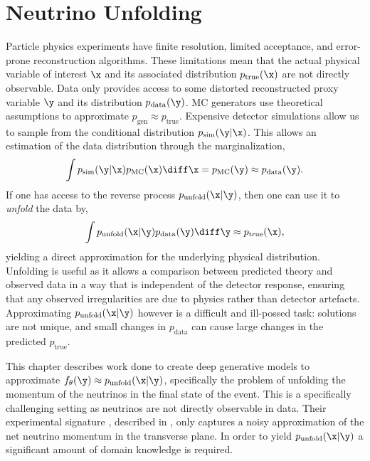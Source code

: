 \chapter{Neutrino Unfolding}
\label{ch:gnns}

Particle physics experiments have finite resolution, limited acceptance, and error-prone reconstruction algorithms.
These limitations mean that the actual physical variable of interest $\x$ and its associated distribution $p_\text{true}(\x)$ are not directly observable.
Data only provides access to some distorted reconstructed proxy variable $\y$ and its distribution $p_\text{data}(\y)$.
MC generators use theoretical assumptions to approximate $p_\text{gen} \approx p_\text{true}$.
Expensive detector simulations allow us to sample from the conditional distribution $p_\text{sim}(\y|\x)$.
This allows an estimation of the data distribution through the marginalization,
\begin{equation}
    \int p_\text{sim}(\y|\x) p_\text{MC}(\x) \diff\x = p_\text{MC}(\y) \approx p_\text{data}(\y).
\end{equation}
If one has access to the reverse process $p_\text{unfold}(\x|\y)$, then one can use it to \textit{unfold} the data by,
\begin{equation}
    \int p_\text{unfold}(\x|\y) p_\text{data}(\y) \diff\y \approx p_\text{true}(\x),
\end{equation}
yielding a direct approximation for the underlying physical distribution.
Unfolding is useful as it allows a comparison between predicted theory and observed data in a way that is independent of the detector response, ensuring that any observed irregularities are due to physics rather than detector artefacts.
Approximating $p_\text{unfold}(\x|\y)$ however is a difficult and ill-possed task: solutions are not unique, and small changes in $p_\text{data}$ can cause large changes in the predicted $p_\text{true}$.

This chapter describes work done to create deep generative models to approximate $f_\theta(\y) \approx p_\text{unfold}(\x|\y)$, specifically the problem of unfolding the momentum of the neutrinos in the final state of the event.
This is a specifically challenging setting as neutrinos are not directly observable in data.
Their experimental signature \ptmiss, described in , only captures a noisy approximation of the net neutrino momentum in the transverse plane.
In order to yield $p_\text{unfold}(\x|\y)$ a significant amount of domain knowledge is required.

